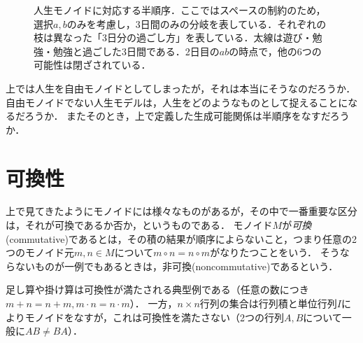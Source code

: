 \documentclass[11pt,a4paper, dvipdfmx]{jsarticle}
\begin{document}
\begin{figure}[h]
    \centering
      \caption{人生モノイドに対応する半順序．ここではスペースの制約のため，選択$a, b$のみを考慮し，3日間のみの分岐を表している．それぞれの枝は異なった「3日分の過ごし方」を表している．太線は遊び・勉強・勉強と過ごした3日間である．2日目の$ab$の時点で，他の6つの可能性は閉ざされている．}
      \label{fig:monoid_tree}
\end{figure}

\begin{renshu}{}{}
    上では人生を自由モノイドとしてしまったが，それは本当にそうなのだろうか．
    自由モノイドでない人生モデルは，人生をどのようなものとして捉えることになるだろうか．
    またそのとき，上で定義した生成可能関係は半順序をなすだろうか．
\end{renshu}    


\section{可換性}
上で見てきたようにモノイドには様々なものがあるが，その中で一番重要な区分は，それが可換であるか否か，というものである．
モノイド$M$が\emph{可換}(commutative)であるとは，その積の結果が順序によらないこと，つまり任意の2つのモノイド元$m,n \in M$について$m \circ n = n \circ m$がなりたつことをいう．
そうならないものが一例でもあるときは，非可換(noncommutative)であるという．

\begin{rei}{}{}
    足し算や掛け算は可換性が満たされる典型例である（任意の数につき$m+n = n+m, m\cdot n = n\cdot m$）．
    一方，$n \times n$行列の集合は行列積と単位行列$I$によりモノイドをなすが，これは可換性を満たさない（2つの行列$A, B$について一般に$AB \neq BA$）．
\end{rei}
\end{document}
